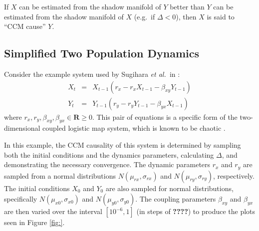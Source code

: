 \documentclass[a4paper,11pt]{article}
\begin{document}
If $X$ can be estimated from the shadow manifold of $Y$ better than $Y$ can be estimated from the shadow manifold of $X$ (e.g.\ if $\Delta < 0$), then $X$ is said to ``CCM cause'' $Y$.

\subsection{Simplified Two Population Dynamics}
\label{sec:2Pop}
Consider the example system used by Sugihara {\em et al.\ }in \cite{Sugihara2012}:
\begin{eqnarray}
\label{eqn:2pop}
X_t &=& X_{t-1}\left(r_x-r_x X_{t-1}-\beta_{xy} Y_{t-1}\right)\\
Y_t &=& Y_{t-1}\left(r_y-r_y Y_{t-1}-\beta_{yx} X_{t-1}\right)
\end{eqnarray}
where $r_x,r_y,\beta_{xy},\beta_{yx}\in\mathbf{R}\ge 0$.  This pair of equations is a specific form of the two-dimensional coupled logistic map system, which is known to be chaotic \cite{Lloyd1995}.

In this example, the CCM causality of this system is determined by sampling both the initial conditions and the dynamics parameters, calculating $\Delta$, and demonstrating the necessary convergence.  The dynamic parameters $r_x$ and $r_y$ are sampled from a normal distributions $N\left(\mu_{rx},\sigma_{rx}\right)$ and $N\left(\mu_{ry},\sigma_{ry}\right)$, respectively.  The initial conditions $X_0$ and $Y_0$ are also sampled for normal distributions, specifically $N\left(\mu_{x0},\sigma_{x0}\right)$ and $N\left(\mu_{y0},\sigma_{y0}\right)$.  The coupling parameters $\beta_{xy}$ and $\beta_{yx}$ are then varied over the interval $[10^{-6},1]$ (in steps of {\bf ????}) to produce the plots seen in Figure \ref{fig:}.
\end{document}
